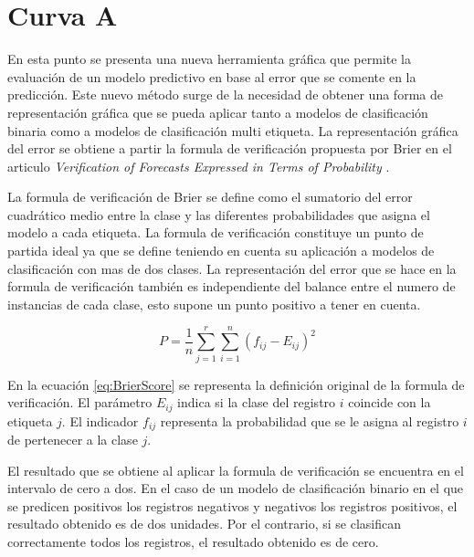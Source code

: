 \section{Curva A}

En esta punto se presenta una nueva herramienta gráfica que permite la evaluación de un modelo predictivo en base al error que se comente en la predicción. Este nuevo método surge de la necesidad de obtener una forma de representación gráfica que se pueda aplicar tanto a modelos de clasificación binaria como a modelos de clasificación multi etiqueta. La representación gráfica del error se obtiene a partir la formula de verificación propuesta por Brier en el articulo \textit{Verification of Forecasts Expressed in Terms of Probability} \cite{brie_1950}.

\bigbreak

La formula de verificación de Brier se define como el sumatorio del error cuadrático medio entre la clase y las diferentes probabilidades que asigna el modelo a cada etiqueta. La formula de verificación constituye un punto de partida ideal ya que se define teniendo en cuenta su aplicación a modelos de clasificación con mas de dos clases. La representación del error que se hace en la formula de verificación también es independiente del balance entre el numero de instancias de cada clase, esto supone un punto positivo a tener en cuenta.

\bigbreak

\begin{equation}
    P = \frac{1}{n}\sum_{j=1}^{r}\sum_{i=1}^{n}{(f_{ij}-E_{ij})^{2}}
    \label{eq:BrierScore}
\end{equation}

\bigbreak


En la ecuación \ref{eq:BrierScore} se representa la definición original de la formula de verificación. El parámetro $E_{ij}$ indica si la clase del registro $i$ coincide con la etiqueta $j$. El indicador $f_{ij}$ representa la probabilidad que se le asigna al registro $i$ de pertenecer a la clase $j$.

\bigbreak

El resultado que se obtiene al aplicar la formula de verificación se encuentra en el intervalo de cero a dos. En el caso de un modelo de clasificación binario en el que se predicen positivos los registros negativos y negativos los registros positivos, el resultado obtenido es de dos unidades. Por el contrario, si se clasifican correctamente todos los registros, el resultado obtenido es de cero.

